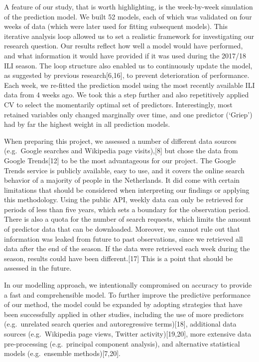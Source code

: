 \documentclass[]{article}
\begin{document}
A feature of our study, that is worth highlighting, is the week-by-week
simulation of the prediction model. We built 52 models, each of which
was validated on four weeks of data (which were later used for fitting
subsequent models). This iterative analysis loop allowed us to set a
realistic framework for investigating our research question. Our results
reflect how well a model would have performed, and what information it
would have provided if it was used during the 2017/18 ILI season. The
loop structure also enabled us to continuously update the model, as
suggested by previous research{[}6,16{]}, to prevent deterioration of
performance. Each week, we re-fitted the prediction model using the most
recently available ILI data from 4 weeks ago. We took this a step
further and also repetitively applied CV to select the momentarily
optimal set of predictors. Interestingly, most retained variables only
changed marginally over time, and one predictor (`Griep') had by far the
highest weight in all prediction models.

When preparing this project, we assessed a number of different data
sources (e.g.~Google searches and Wikipedia page visits),{[}8{]} but
chose the data from Google Trends{[}12{]} to be the most advantageous
for our project. The Google Trends service is publicly available, easy
to use, and it covers the online search behavior of a majority of people
in the Netherlands. It did come with certain limitations that should be
considered when interpreting our findings or applying this methodology.
Using the public API, weekly data can only be retrieved for periods of
less than five years, which sets a boundary for the observation period.
There is also a quota for the number of search requests, which limits
the amount of predictor data that can be downloaded. Moreover, we cannot
rule out that information was leaked from future to past observations,
since we retrieved all data after the end of the season. If the data
were retrieved each week during the season, results could have been
different.{[}17{]} This is a point that should be assessed in the
future.

In our modelling approach, we intentionally compromised on accuracy to
provide a fast and comprehensible model. To further improve the
predictive performance of our method, the model could be expanded by
adopting strategies that have been successfully applied in other
studies, including the use of more predictors (e.g.~unrelated search
queries and autoregressive terms){[}18{]}, additional data sources
(e.g.~Wikipedia page views, Twitter activity){[}19,20{]}, more extensive
data pre-processing (e.g.~principal component analysis), and alternative
statistical models (e.g.~ensemble methods){[}7,20{]}.
\end{document}
